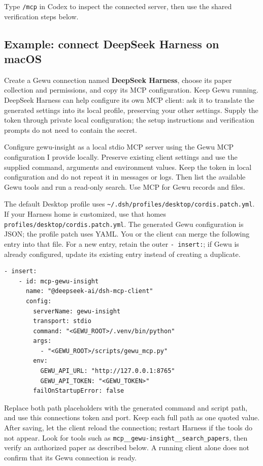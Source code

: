 \documentclass[10pt,letterpaper,oneside]{scrreprt}
\renewenvironment{quote}
  {\Needspace{5\baselineskip}\begin{tcolorbox}[enhanced,breakable,colback=GewuPale,colframe=GewuPale,boxrule=0pt,
    borderline west={1.6pt}{0pt}{GewuBlue},arc=1.2mm,left=2.5mm,right=2.5mm,top=1.7mm,bottom=1.7mm,
    before skip=4pt,after skip=5pt,fontupper=\color{GewuInk}\small]}
  {\end{tcolorbox}}
\begin{document}
Type \texttt{/mcp} in Codex to inspect the connected server, then use the shared verification steps below.

\subsection{Example: connect DeepSeek Harness on macOS}\label{example-connect-deepseek-harness-on-macos}

Create a Gewu connection named \textbf{DeepSeek Harness}, choose its paper collection and permissions, and copy its MCP configuration. Keep Gewu running. DeepSeek Harness can help configure its own MCP client: ask it to translate the generated settings into its local profile, preserving your other settings. Supply the token through private local configuration; the setup instructions and verification prompts do not need to contain the secret.

\begin{quote}
Configure gewu-insight as a local stdio MCP server using the Gewu MCP configuration I provide locally. Preserve existing client settings and use the supplied command, arguments and environment values. Keep the token in local configuration and do not repeat it in messages or logs. Then list the available Gewu tools and run a read-only search. Use MCP for Gewu records and files.
\end{quote}

The default Desktop profile uses \texttt{\textasciitilde{}/.dsh/profiles/desktop/cordis.patch.yml}. If your Harness home is customized, use that home\textquotesingle s \texttt{profiles/desktop/cordis.patch.yml}. The generated Gewu configuration is JSON; the profile patch uses YAML. You or the client can merge the following entry into that file. For a new entry, retain the outer \texttt{-\ insert:}; if Gewu is already configured, update its existing entry instead of creating a duplicate.

\begin{verbatim}
- insert:
    - id: mcp-gewu-insight
      name: "@deepseek-ai/dsh-mcp-client"
      config:
        serverName: gewu-insight
        transport: stdio
        command: "<GEWU_ROOT>/.venv/bin/python"
        args:
          - "<GEWU_ROOT>/scripts/gewu_mcp.py"
        env:
          GEWU_API_URL: "http://127.0.0.1:8765"
          GEWU_API_TOKEN: "<GEWU_TOKEN>"
        failOnStartupError: false
\end{verbatim}

Replace both path placeholders with the generated command and script path, and use this connection\textquotesingle s token and port. Keep each full path as one quoted value. After saving, let the client reload the connection; restart Harness if the tools do not appear. Look for tools such as \texttt{mcp\_\_gewu-insight\_\_search\_papers}, then verify an authorized paper as described below. A running client alone does not confirm that its Gewu connection is ready.
\end{document}
